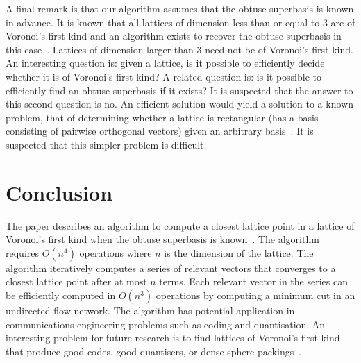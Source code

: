 \documentclass[final,leqno]{siamltex}
\begin{document}
A final remark is that our algorithm assumes that the obtuse superbasis is known in advance.  It is known that all lattices of dimension less than or equal to 3 are of Voronoi's first kind and an algorithm exists to recover the obtuse superbasis in this case~\cite{SPLAG}.  Lattices of dimension larger than 3 need not be of Voronoi's first kind.  An interesting question is: given a lattice, is it possible to efficiently decide whether it is of Voronoi's first kind?  A related question is: is it possible to efficiently find an obtuse superbasis if it exists?  It is suspected that the answer to this second question is no.  An efficient solution would yield a solution to a known problem, that of determining whether a lattice is rectangular (has a basis consisting of pairwise orthogonal vectors) given an arbitrary basis~\cite{Lenstra_Silverberg_revisting_gentra_szydlo_2014}.  It is suspected that this simpler problem is difficult.


\section{Conclusion}

The paper describes an algorithm to compute a closest lattice point in a lattice of Voronoi's first kind when the obtuse superbasis is known~\cite{ConwaySloane1992_voronoi_lattice_3d_obtuse_superbases}.  The algorithm requires $O(n^4)$ operations where $n$ is the dimension of the lattice.  The algorithm iteratively computes a series of relevant vectors that converges to a closest lattice point after at most $n$ terms.   Each relevant vector in the series can be efficiently computed in $O(n^3)$ operations by computing a minimum cut in an undirected flow network.  The algorithm has potential application in communications engineering problems such as coding and quantisation.  An interesting problem for future research is to find lattices of Voronoi's first kind that produce good codes, good quantisers, or dense sphere packings~\cite{SPLAG,Conway1982VoronoiRegions}.


\end{document}
